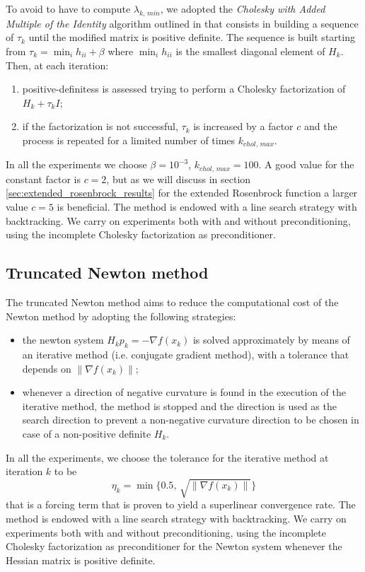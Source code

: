 To avoid to have to compute $\lambda_{k,\,min}$, we adopted the \textit{Cholesky with Added Multiple of the Identity} algorithm outlined in \cite{nocedal-optimization} that consists in building a sequence of $\tau_k$ until the modified matrix is positive definite.
The sequence is built starting from $\tau_k = \min_i h_{ii} + \beta$ where $\min_i h_{ii}$ is the smallest diagonal element of $H_k$.
Then, at each iteration:
\begin{enumerate}
\item positive-definitess is assessed trying to perform a Cholesky factorization of $H_k + \tau_k I$;
\item if the factorization is not successful, $\tau_k$ is increased by a factor $c$ and the process is repeated for a limited number of times $k_{chol,\,max}$.
\end{enumerate}
In all the experiments we choose $\beta = 10^{-3}$, $k_{chol,\,max} = 100$.
A good value for the constant factor is $c=2$, but as we will discuss in section \ref{sec:extended_rosenbrock_results} for the extended Rosenbrock function a larger value $c=5$ is beneficial.
The method is endowed with a line search strategy with backtracking.
We carry on experiments both with and without preconditioning, using the incomplete Cholesky factorization as preconditioner.

\subsection{Truncated Newton method}

The truncated Newton method aims to reduce the computational cost of the Newton method by adopting the following strategies:
\begin{itemize}
    \item the newton system $H_k p_k = -\nabla f(x_k)$ is solved approximately by means of an iterative method (i.e. conjugate gradient method), with a tolerance that depends on $\lVert \nabla f(x_k) \rVert$;
    \item whenever a direction of negative curvature is found in the execution of the iterative method, the method is stopped and the direction is used as the search direction to prevent a non-negative curvature direction to be chosen in case of a non-positive definite $H_k$.
\end{itemize}
In all the experiments, we choose the tolerance for the iterative method at iteration $k$ to be 
\[
\eta_k = \min\{0.5,\, \sqrt{\lVert \nabla f(x_k) \rVert}\}
\]
that is a forcing term that is proven to yield a superlinear convergence rate.
The method is endowed with a line search strategy with backtracking.
We carry on experiments both with and without preconditioning, using the incomplete Cholesky factorization as preconditioner for the Newton system whenever the Hessian matrix is positive definite.

